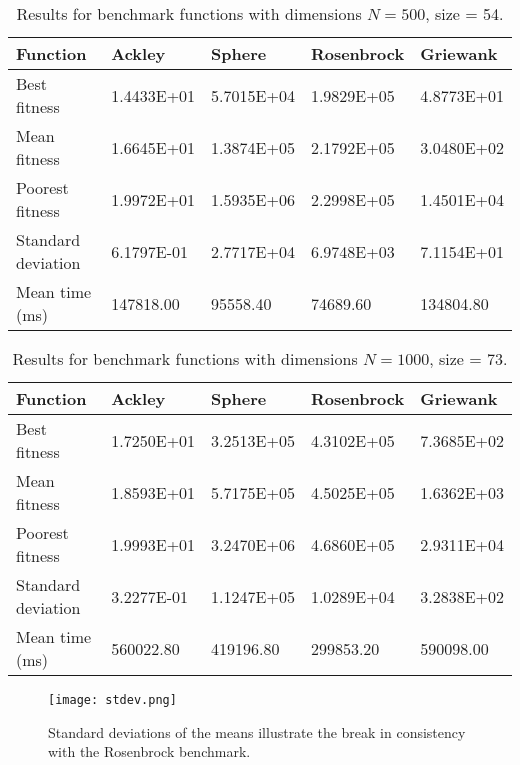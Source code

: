 \documentclass[KomodoMain.tex]{subfiles}
\begin{document}
\begin{table}[!htbp]
\small
\caption{ \small Results for benchmark functions with dimensions $N = 500$, size = 54.}
\label{table:X}
\begin{tabular}{ p{3cm} p{2.4cm} p{2.4cm} p{2.4cm} p{2.4cm}}
 \hline
 Function   & Ackley  & Sphere & Rosenbrock & Griewank \\
 \hline
 Best fitness  & 1.4433E+01 & 5.7015E+04 & 1.9829E+05 & 4.8773E+01  \\
 
 Mean fitness & 1.6645E+01 & 1.3874E+05 & 2.1792E+05 & 3.0480E+02 \\
 
 Poorest fitness & 1.9972E+01 & 1.5935E+06 & 2.2998E+05 & 1.4501E+04\\
 
 Standard deviation & 6.1797E-01 & 2.7717E+04 & 6.9748E+03 & 7.1154E+01 \\
 
 Mean time (ms) & 147818.00 & 95558.40 & 74689.60 & 134804.80\\
 \hline
\end{tabular}
\end{table}

\begin{table}[!htbp]
\small
\caption{\small Results for benchmark functions with dimensions $N = 1000$, size = 73.}
\label{table:X}
\begin{tabular}{ p{3cm} p{2.4cm} p{2.4cm} p{2.4cm} p{2.4cm}}
 \hline
 Function   & Ackley  & Sphere & Rosenbrock & Griewank \\
 \hline
 Best fitness   & 1.7250E+01 & 3.2513E+05 & 4.3102E+05 &  7.3685E+02 \\
 
 Mean fitness & 1.8593E+01 & 5.7175E+05 & 4.5025E+05 & 1.6362E+03 \\
 
 Poorest fitness & 1.9993E+01 & 3.2470E+06 & 4.6860E+05 & 2.9311E+04 \\
 
 Standard deviation & 3.2277E-01 & 1.1247E+05 & 1.0289E+04 & 3.2838E+02 \\
 
 Mean time (ms) & 560022.80 & 419196.80 & 299853.20 & 590098.00 \\
 \hline
\end{tabular}
\end{table}


\newpage

\begin{figure}[!htbp]
\caption{Standard deviations of the means illustrate the break in consistency with the Rosenbrock benchmark.}
\centering
\texttt{[image: stdev.png]}
\end{figure}
\end{document}
